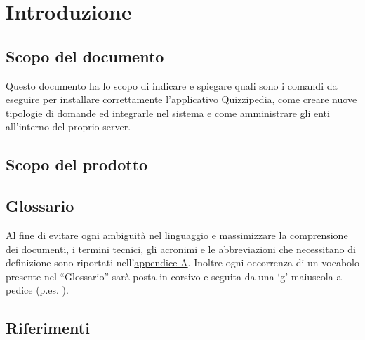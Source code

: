 \documentclass[a4paper, titlepage]{article}
\begin{document}
	
	\pagestyle{fancy}	
	
	\maketitle
	
	
	
	\newpage
	\tableofcontents\label{lastromanpage}
	
	\newpage
	\clearpage	
	\hypersetup{linkcolor=blue}
	
	\section{Introduzione}
	\subsection{Scopo del documento}
	Questo documento ha lo scopo di indicare e spiegare quali sono i comandi da eseguire per installare correttamente l'applicativo Quizzipedia, come creare nuove tipologie di domande ed integrarle nel sistema e come amministrare gli enti all'interno del proprio server.
	
	\subsection{Scopo del prodotto}
	\SCOPO
	
	\subsection{Glossario}
	Al fine di evitare ogni ambiguità nel linguaggio e massimizzare la comprensione dei documenti, i termini tecnici, gli acronimi e le abbreviazioni che necessitano di definizione sono riportati nell'\hyperref[gl]{appendice A}.
	Inoltre ogni occorrenza di un vocabolo presente nel “Glossario” sarà posta in corsivo e seguita da
	una ‘g’ maiuscola a pedice (p.es. ).
		
	\subsection{Riferimenti}	
\end{document}

